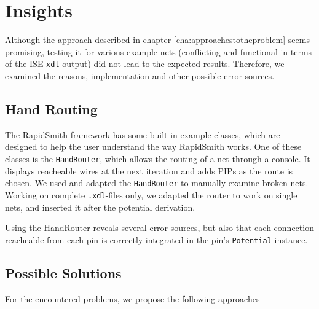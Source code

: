 \chapter{Insights}
\label{cha:insights}

Although the approach described in chapter \ref{cha:approachestotheproblem} seems promising, testing it for various example nets (conflicting and functional in terms of the ISE \texttt{xdl} output) did not lead to the expected results. Therefore, we examined the reasons, implementation and other possible error sources.

\section{Hand Routing}
\label{sec:handrouting}

The RapidSmith framework has some built-in example classes, which are designed to help the user understand the way RapidSmith works. One of these classes is the \texttt{HandRouter}, which allows the routing of a net through a console. It displays reacheable wires at the next iteration and adds PIPs as the route is chosen. We used and adapted the \texttt{HandRouter} to manually examine broken nets. Working on complete \texttt{.xdl}-files only, we adapted the router to work on single nets, and inserted it after the potential derivation.

Using the HandRouter reveals several error sources, but also that each connection reacheable from each pin is correctly integrated in the pin's \texttt{Potential} instance. 

\section{Possible Solutions}
\label{sec:possibleSolutions}

For the encountered problems, we propose the following approaches

